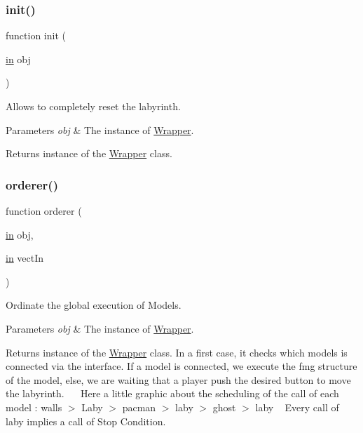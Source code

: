 \subsubsection{\texorpdfstring{init()}{init()}}
{\footnotesize\ttfamily function init (\begin{DoxyParamCaption}\item[{\hyperlink{class_wrapper_a5e252d97ca5bf85c5753e2914673eead}{in}}]{obj }\end{DoxyParamCaption})}



Allows to completely reset the labyrinth. 


\begin{DoxyParams}{Parameters}
{\em obj} & The instance of \hyperlink{class_wrapper}{Wrapper}. \\
\hline
\end{DoxyParams}
\begin{DoxyReturn}{Returns}
instance of the \hyperlink{class_wrapper}{Wrapper} class. 
\end{DoxyReturn}
\mbox{\label{class_wrapper_a9c889c73b9d4b80dde64dfe385ed747e}} 
\subsubsection{\texorpdfstring{orderer()}{orderer()}}
{\footnotesize\ttfamily function orderer (\begin{DoxyParamCaption}\item[{\hyperlink{class_wrapper_a5e252d97ca5bf85c5753e2914673eead}{in}}]{obj,  }\item[{\hyperlink{class_wrapper_a5e252d97ca5bf85c5753e2914673eead}{in}}]{vect\+In }\end{DoxyParamCaption})}



Ordinate the global execution of Models. 


\begin{DoxyParams}{Parameters}
{\em obj} & The instance of \hyperlink{class_wrapper}{Wrapper}. \\
\hline
\end{DoxyParams}
\begin{DoxyReturn}{Returns}
instance of the \hyperlink{class_wrapper}{Wrapper} class. In a first case, it checks which models is connected via the interface. If a model is connected, we execute the \textquotesingle{}fmg\textquotesingle{} structure of the model, else, we are waiting that a player push the desired button to move the labyrinth.~\newline
~\newline
 Here a little graphic about the scheduling of the call of each model \+: walls $>$ Laby $>$ pacman $>$ laby $>$ ghost $>$ laby ~\newline
 Every call of \textquotesingle{}laby\textquotesingle{} implies a call of Stop Condition. 
\end{DoxyReturn}
\mbox{\label{class_wrapper_aa41b9b215897635f48e1c8a4eaca7640}} 
